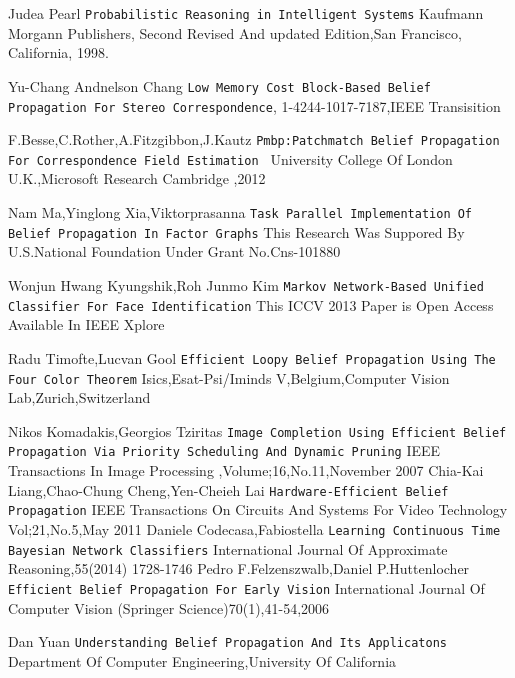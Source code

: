 \documentclass{raitdisser}
\begin{document}
\begin{thebibliography}{9}
Judea Pearl
\texttt{Probabilistic Reasoning in Intelligent Systems}
Kaufmann Morgann Publishers, Second Revised And updated Edition,San Francisco, California, 1998.

Yu-Chang Andnelson Chang
\texttt{Low Memory Cost Block-Based Belief Propagation For Stereo Correspondence},
1-4244-1017-7187,IEEE Transisition

F.Besse,C.Rother,A.Fitzgibbon,J.Kautz
\texttt{Pmbp:Patchmatch Belief Propagation For Correspondence Field Estimation }
University College Of London U.K.,Microsoft Research Cambridge ,2012

Nam Ma,Yinglong Xia,Viktorprasanna
\texttt{Task Parallel Implementation Of Belief Propagation In Factor Graphs}
This Research Was Suppored By U.S.National Foundation Under Grant No.Cns-101880

Wonjun Hwang Kyungshik,Roh Junmo Kim
\texttt{Markov Network-Based Unified Classifier For Face Identification}
This ICCV 2013 Paper is Open Access Available In IEEE Xplore

Radu Timofte,Lucvan Gool
\texttt{Efficient Loopy Belief Propagation Using The Four Color Theorem}
Isics,Esat-Psi/Iminds V,Belgium,Computer Vision Lab,Zurich,Switzerland

Nikos Komadakis,Georgios Tziritas
\texttt{Image Completion Using Efficient Belief Propagation Via Priority Scheduling And Dynamic Pruning}
IEEE Transactions In Image Processing ,Volume;16,No.11,November 2007
Chia-Kai Liang,Chao-Chung Cheng,Yen-Cheieh Lai
\texttt{Hardware-Efficient Belief Propagation}
IEEE Transactions On Circuits And Systems For Video Technology Vol;21,No.5,May 2011
Daniele Codecasa,Fabiostella
\texttt{Learning Continuous Time Bayesian Network Classifiers}
International Journal Of Approximate Reasoning,55(2014) 1728-1746
Pedro F.Felzenszwalb,Daniel P.Huttenlocher
\texttt{Efficient Belief Propagation For Early Vision}
International Journal Of Computer Vision (Springer Science)70(1),41-54,2006

Dan Yuan
\texttt{Understanding Belief Propagation And Its Applicatons}
Department Of Computer Engineering,University Of California


\end{thebibliography}
\end{document}
